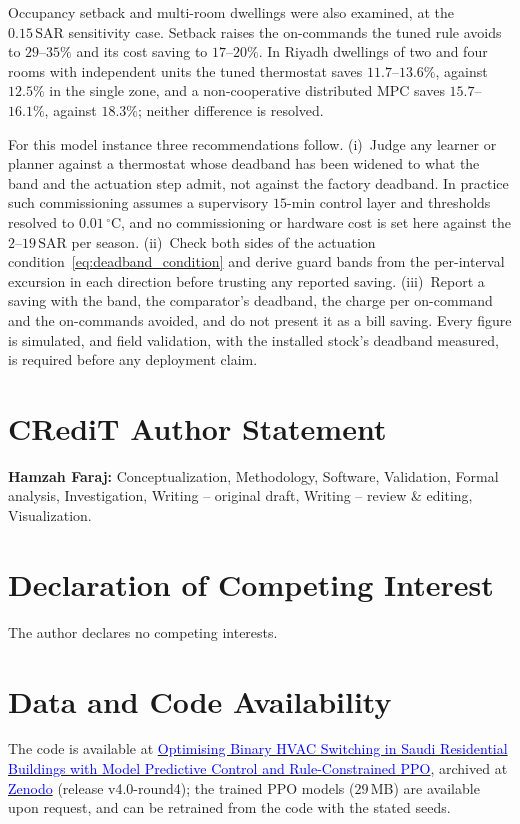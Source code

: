 \documentclass[3p,twocolumn,number]{elsarticle}
\newcommand{\SAR}{\text{SAR}}
\begin{document}
Occupancy setback and multi-room dwellings were also examined, at the $0.15\,\SAR$ sensitivity case. Setback raises the on-commands the tuned rule avoids to $29$--$35\%$ and its cost saving to $17$--$20\%$. In Riyadh dwellings of two and four rooms with independent units the tuned thermostat saves $11.7$--$13.6\%$, against $12.5\%$ in the single zone, and a non-cooperative distributed MPC saves $15.7$--$16.1\%$, against $18.3\%$; neither difference is resolved.

For this model instance three recommendations follow. (i)~Judge any learner or planner against a thermostat whose deadband has been widened to what the band and the actuation step admit, not against the factory deadband. In practice such commissioning assumes a supervisory $15$-min control layer and thresholds resolved to $0.01\,^\circ$C, and no commissioning or hardware cost is set here against the $2$--$19\,\SAR$ per season. (ii)~Check both sides of the actuation condition~\eqref{eq:deadband_condition} and derive guard bands from the per-interval excursion in each direction before trusting any reported saving. (iii)~Report a saving with the band, the comparator's deadband, the charge per on-command and the on-commands avoided, and do not present it as a bill saving. Every figure is simulated, and field validation, with the installed stock's deadband measured, is required before any deployment claim.

\section{CRediT Author Statement}
\textbf{Hamzah Faraj:} Conceptualization, Methodology, Software, Validation, Formal analysis, Investigation, Writing -- original draft, Writing -- review \& editing, Visualization.

\section{Declaration of Competing Interest}
The author declares no competing interests.

 
\section{Data and Code Availability}
\label{sec:data}
The code is available at \href{https://github.com/drhamzahfaraj/Hybrid-Rule-Constrained-PPO-for-Cost-Effective-Binary-HVAC-Scheduling-in-Saudi-Residential-Buildings}{\textcolor{blue}{Optimising Binary HVAC Switching in Saudi Residential Buildings with Model Predictive Control and Rule-Constrained PPO}}, archived at \href{https://doi.org/10.5281/zenodo.24199676}{\textcolor{blue}{Zenodo}} (release v4.0-round4); the trained PPO models ($29\,$MB) are available upon request, and can be retrained from the code with the stated seeds.
\end{document}
